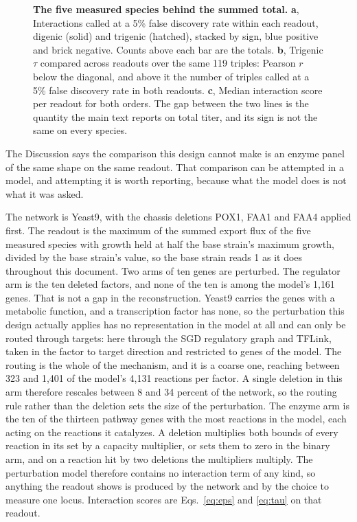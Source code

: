 \begin{figure}[t]
\caption{\textbf{The five measured species behind the summed total.} \textbf{a},
Interactions called at a 5\% false discovery rate within each readout, digenic (solid) and
trigenic (hatched), stacked by sign, blue positive and brick negative. Counts above each
bar are the totals. \textbf{b}, Trigenic $\tau$ compared across readouts over the same 119
triples: Pearson $r$ below the diagonal, and above it the number of triples called at a 5\%
false discovery rate in both readouts. \textbf{c}, Median interaction score per readout for
both orders. The gap between the two lines is the quantity the main text reports on total
titer, and its sign is not the same on every species.}
\label{fig:si-species}
\end{figure}


The Discussion says the comparison this design cannot make is an enzyme panel of the same
shape on the same readout. That comparison can be attempted in a model, and attempting it
is worth reporting, because what the model does is not what it was asked.

 The network is Yeast9, with the chassis deletions POX1, FAA1 and FAA4
applied first. The readout is the maximum of the summed export flux of the five measured
species with growth held at half the base strain's maximum growth, divided by the base
strain's value, so the base strain reads 1 as it does throughout this document. Two arms
of ten genes are perturbed. The regulator arm is the ten deleted factors, and none of the
ten is among the model's 1{,}161 genes. That is not a gap in the reconstruction. Yeast9
carries the genes with a metabolic function, and a transcription factor has none, so the
perturbation this design actually applies has no representation in the model at all and can
only be routed through targets: here through the SGD regulatory graph and TFLink, taken in
the factor to target direction and restricted to genes of the model. The routing is the
whole of the mechanism, and it is a coarse one, reaching between 323 and 1{,}401 of the
model's 4{,}131 reactions per factor. A single deletion in this arm therefore rescales
between 8 and 34 percent of the network, so the routing rule rather than the deletion sets
the size of the perturbation. The
enzyme arm is the ten of the thirteen pathway genes with the most reactions in the model,
each acting on the reactions it catalyzes. A deletion multiplies both bounds of every
reaction in its set by a capacity multiplier, or sets them to zero in the binary arm, and
on a reaction hit by two deletions the multipliers multiply. The perturbation model
therefore contains no interaction term of any kind, so anything the readout shows is
produced by the network and by the choice to measure one locus. Interaction scores are
Eqs.~\ref{eq:eps} and \ref{eq:tau} on that readout.

